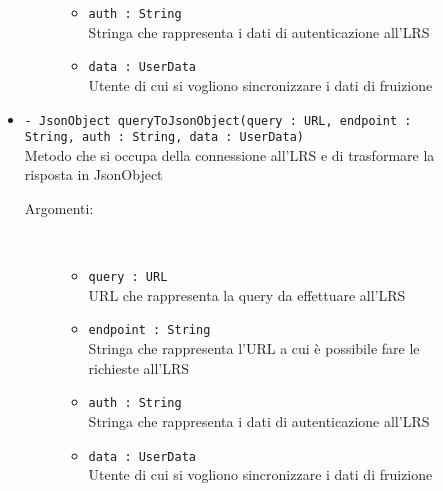 \documentclass[../Tesi.tex]{subfiles}
\begin{document}
\begin{description}
\begin{itemize}
\begin{description}
\begin{itemize}
						\item \texttt{auth : String}\\
						Stringa che rappresenta i dati di autenticazione all'LRS

						\item \texttt{data : UserData}\\
						Utente di cui si vogliono sincronizzare i dati di fruizione
					\end{itemize}
				\end{description}

				\item \texttt{- JsonObject queryToJsonObject(query : URL, endpoint : String, auth : String, data : UserData)}\\
				Metodo che si occupa della connessione all'LRS e di trasformare la risposta in JsonObject
				\begin{description}
					\item[Argomenti:] \
					\begin{itemize}
						\item \texttt{query : URL}\\
						URL che rappresenta la query da effettuare all'LRS

						\item \texttt{endpoint : String}\\
						Stringa che rappresenta l'URL a cui è possibile fare le richieste all'LRS

						\item \texttt{auth : String}\\
						Stringa che rappresenta i dati di autenticazione all'LRS

						\item \texttt{data : UserData}\\
						Utente di cui si vogliono sincronizzare i dati di fruizione
					\end{itemize}
				\end{description}

			\end{itemize}
		\end{description}
\end{document}
